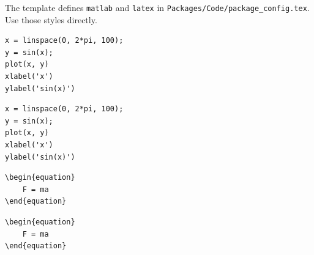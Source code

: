\begin{referencecode}

\end{referencecode}
The template defines \texttt{matlab} and \texttt{latex} in
\texttt{Packages/Code/package\_config.tex}. Use those styles directly.
\begin{referencecode}
\begin{lstlisting}[style=matlab]
x = linspace(0, 2*pi, 100);
y = sin(x);
plot(x, y)
xlabel('x')
ylabel('sin(x)')
\end{lstlisting}
\end{referencecode}

\begin{lstlisting}[style=matlab]
x = linspace(0, 2*pi, 100);
y = sin(x);
plot(x, y)
xlabel('x')
ylabel('sin(x)')
\end{lstlisting}

\begin{referencecode}
\begin{lstlisting}[style=latex]
\begin{equation}
    F = ma
\end{equation}
\end{lstlisting}
\end{referencecode}

\begin{lstlisting}[style=latex]
\begin{equation}
    F = ma
\end{equation}
\end{lstlisting}

